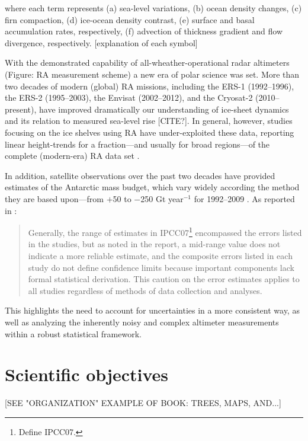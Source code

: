 where each term represents (a) sea-level variations, (b) ocean density changes, (c) firn compaction, (d) ice-ocean density contrast, (e) surface and basal accumulation rates, respectively, (f) advection of thickness gradient and flow divergence, respectively. [explanation of each symbol]

With the demonstrated capability of all-wheather-operational radar altimeters
(Figure: RA measurement scheme)
a new era of polar science was set. More than two decades of modern (global) RA missions,
including the ERS-1 (1992--1996), the ERS-2 (1995--2003), the Envisat (2002--2012), and
the Cryosat-2 (2010--present), have improved dramatically our understanding of ice-sheet
dynamics and its relation to measured sea-level rise [CITE?]. In general, however,
studies focusing on the ice shelves using RA have under-exploited these data,
reporting linear height-trends for a fraction---and usually for broad regions---of the complete (modern-era) RA data set \parencite{Shepherd2003, Shepherd2010, Zwally2005}.

In addition, satellite observations over the past two decades have provided estimates of
the Antarctic mass budget, which vary widely according the method they are based upon---from
$+$50 to $-$250 Gt year$^{-1}$ for 1992--2009 \parencite{Zwally2011}. As reported in
\textcite{Zwally2011}:

\begin{quotation}
\noindent
Generally, the range of estimates in IPCC07\footnote{Define IPCC07.} encompassed the errors listed in the studies, but as noted in the report, a mid-range value does not indicate a more reliable estimate, and the composite errors listed in each study do not define confidence limits because important components lack formal statistical derivation. This caution on the error estimates applies to all studies regardless of methods of data collection and analyses.
\end{quotation}

This highlights the need to account for uncertainties in a more consistent way, as well as analyzing the inherently noisy and complex altimeter measurements within a robust statistical framework.

\section*{Scientific objectives}

[SEE "ORGANIZATION" EXAMPLE OF BOOK: TREES, MAPS, AND...]

